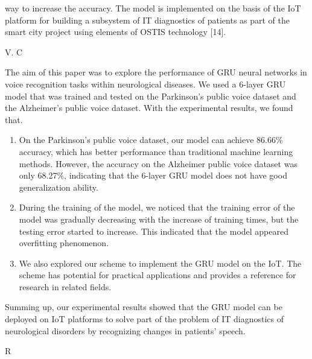 \documentclass{article}
\begin{document}
\begin{multicols}{2}

\raggedright


\begin{minipage}[t]{0.49\textwidth} \fontsize{9}{7}\selectfont
way to increase the accuracy. The model is implemented on the basis of the IoT platform for building a subsystem of IT diagnostics of patients as part of the smart city project using elements of OSTIS technology [14].

\begin{center}
\textsc{V. C}
\end{center}

\hspace{0.2cm}  The aim of this paper was to explore the performance of GRU neural networks in voice recognition tasks within neurological diseases. We used a 6-layer GRU model that was trained and tested on the Parkinson’s public voice dataset and the Alzheimer’s public voice dataset. With the experimental results, we found that.

\begin{enumerate}[label=\arabic*), noitemsep]
  \item On the Parkinson’s public voice dataset, our model can achieve 86.66\% accuracy, which has better performance than traditional machine learning methods. However, the accuracy on the Alzheimer public voice dataset was only 68.27\%, indicating that the 6-layer GRU model does not have good generalization ability.
  \item During the training of the model, we noticed that the training error of the model was gradually decreasing with the increase of training times, but the testing error started to increase. This indicated that the model appeared overfitting phenomenon.
  \item We also explored our scheme to implement the GRU model on the IoT. The scheme has potential for practical applications and provides a reference for research in related fields.
\end{enumerate}
\hspace{0.2cm}Summing up, our experimental results showed that the GRU model can be deployed on IoT platforms to solve part of the problem of IT diagnostics of neurological disorders by recognizing changes in patients’ speech.

\begin{center}
\textsc{R}
\end{center}


\end{minipage}
\end{multicols}
\end{document}
